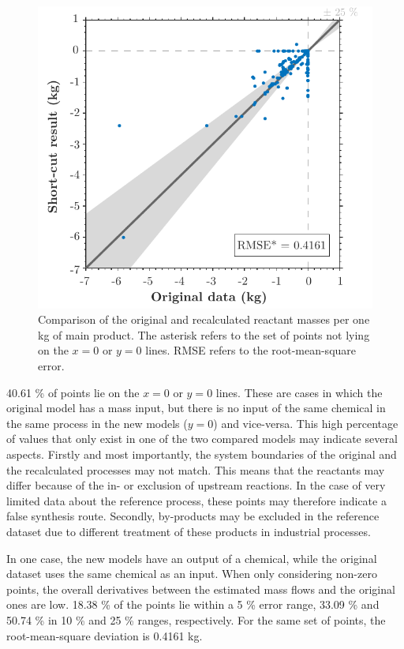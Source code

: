 \begin{figure}[htp!]
        \centering
        \includegraphics{images/masses.pdf}
        \caption{Comparison of the original and recalculated reactant masses per one kg of main product. The asterisk refers to the set of points not lying on the $x=0$ or $y=0$ lines. RMSE refers to the root-mean-square error.}
        \label{fig:masses}
\end{figure}

40.61 \% of points lie on the $x=0$ or $y=0$ lines. These are cases in which the original model has a mass input, but there is no input of the same chemical in the same process in the new models ($y=0$) and vice-versa. This high percentage of values that only exist in one of the two compared models may indicate several aspects. Firstly and most importantly, the system boundaries of the original and the recalculated processes may not match. This means that the  reactants may differ because of the in- or exclusion of upstream reactions. In the case of very limited data about the reference process, these points may therefore indicate a false synthesis route. Secondly, by-products may be excluded in the reference dataset due to different treatment of these products in industrial processes. 

In one case, the new models have an output of a chemical, while the original dataset uses the same chemical as an input. When only considering non-zero points, the overall derivatives between the estimated mass flows and the original ones are low. 18.38 \% of the points lie within a 5 \% error range, 33.09 \% and 50.74 \% in 10 \% and 25 \% ranges, respectively. For the same set of points, the root-mean-square deviation is 0.4161 kg. 


